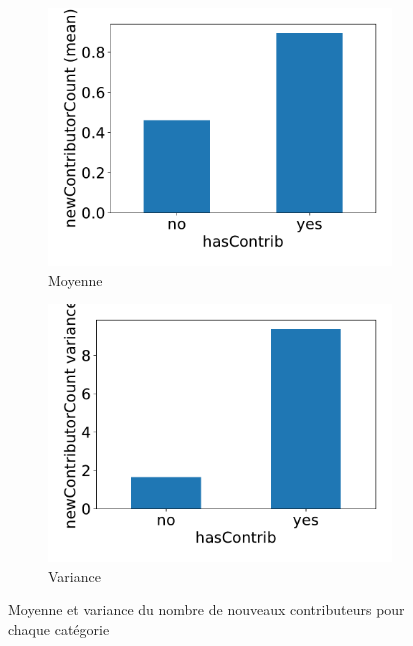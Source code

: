 \documentclass[dvipsnames,runningheads]{llncs}
\begin{document}
    \begin{figure}[ht]
        \begin{subfigure}[t]{0.5\textwidth}
            \includegraphics[width=\textwidth]{../experiment/data_analysis/hasContrib_meanNewContributorCount}
            \caption{Moyenne}
        \end{subfigure}%
        \begin{subfigure}[t]{0.5\textwidth}
            \includegraphics[width=\textwidth]{../experiment/data_analysis/hasContrib_varianceNewContributorCount}
            \caption{Variance}
            \label{sfig:hasContribVariance}
        \end{subfigure}

        \caption{Moyenne et variance du nombre de nouveaux contributeurs pour chaque catégorie}
        \label{fig:hasContrib}
    \end{figure}
\end{document}
